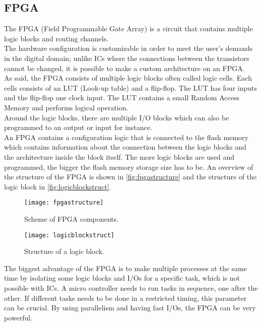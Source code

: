 \subsection{FPGA}


The FPGA (Field Programmable Gate Array) is a circuit that contains multiple logic blocks and routing channels.\\
The hardware configuration is customizable in order to meet the user’s demands in the digital domain; unlike ICs where the connections between the transistors cannot be changed, it is possible to make a custom architecture on an FPGA. \\
As said, the FPGA consists of multiple logic blocks often called logic cells. Each cells consists of an LUT (Look-up table) and a flip-flop. The LUT has four inputs and the flip-flop one clock input. The LUT contains a small Random Access Memory and performs logical operation. \\
Around the logic blocks, there are multiple I/O blocks which can also be programmed to an output or input for instance.  \\
An FPGA contains a configuration logic that is connected to the flash memory which contains information about the connection between the logic blocks and the architecture inside the block itself. The more logic blocks are used and programmed, the bigger the flash memory storage size has to be. An overview of the structure of the FPGA is shown in \autoref{fig:fpgastructure} and the structure of the logic block in \autoref{fig:logicblockstruct}. \\
\newline

\begin{figure}[htbp]
	\centering
	\texttt{[image: fpgastructure]}
	\caption{Scheme of FPGA components.}
	\label{fig:fpgastructure}
\end{figure}

\begin{figure}[htbp]
	\centering
	\texttt{[image: logicblockstruct]}
	\caption{Structure of a logic block.}
	\label{fig:logicblockstruct}
\end{figure}


The biggest advantage of the FPGA is to make multiple processes at the same time by isolating some logic blocks and I/Os for a specific task, which is not possible with ICs. A micro controller needs to run tasks in sequence, one after the other. If different tasks needs to be done in a restricted timing, this parameter can be crucial. 
By using parallelism and having fast I/Os, the FPGA can be very powerful. \\

